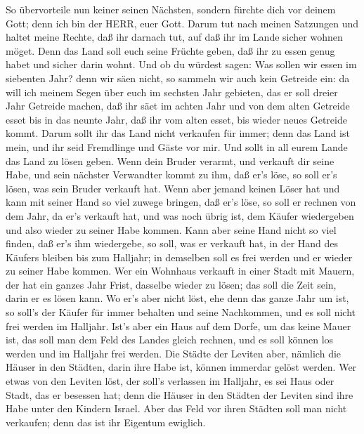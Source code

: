  So übervorteile nun keiner seinen Nächsten, sondern
fürchte dich vor deinem Gott; denn ich bin der HERR, euer Gott.
 Darum tut nach meinen Satzungen und haltet meine Rechte,
daß ihr darnach tut, auf daß ihr im Lande sicher wohnen möget.
 Denn das Land soll euch seine Früchte geben, daß ihr zu
essen genug habet und sicher darin wohnt.  Und ob du
würdest sagen: Was sollen wir essen im siebenten Jahr? denn wir säen
nicht, so sammeln wir auch kein Getreide ein:  da will ich
meinem Segen über euch im sechsten Jahr gebieten, das er soll dreier
Jahr Getreide machen,  daß ihr säet im achten Jahr und von
dem alten Getreide esset bis in das neunte Jahr, daß ihr vom alten
esset, bis wieder neues Getreide kommt.  Darum sollt ihr
das Land nicht verkaufen für immer; denn das Land ist mein, und ihr seid
Fremdlinge und Gäste vor mir.  Und sollt in all eurem Lande
das Land zu lösen geben.  Wenn dein Bruder verarmt, und
verkauft dir seine Habe, und sein nächster Verwandter kommt zu ihm, daß
er's löse, so soll er's lösen, was sein Bruder verkauft hat.
 Wenn aber jemand keinen Löser hat und kann mit seiner Hand
so viel zuwege bringen, daß er's löse,  so soll er rechnen
von dem Jahr, da er's verkauft hat, und was noch übrig ist, dem Käufer
wiedergeben und also wieder zu seiner Habe kommen.  Kann
aber seine Hand nicht so viel finden, daß er's ihm wiedergebe, so soll,
was er verkauft hat, in der Hand des Käufers bleiben bis zum Halljahr;
in demselben soll es frei werden und er wieder zu seiner Habe kommen.
 Wer ein Wohnhaus verkauft in einer Stadt mit Mauern, der
hat ein ganzes Jahr Frist, dasselbe wieder zu lösen; das soll die Zeit
sein, darin er es lösen kann.  Wo er's aber nicht löst, ehe
denn das ganze Jahr um ist, so soll's der Käufer für immer behalten und
seine Nachkommen, und es soll nicht frei werden im Halljahr.
 Ist's aber ein Haus auf dem Dorfe, um das keine Mauer ist,
das soll man dem Feld des Landes gleich rechnen, und es soll können los
werden und im Halljahr frei werden.  Die Städte der Leviten
aber, nämlich die Häuser in den Städten, darin ihre Habe ist, können
immerdar gelöst werden.  Wer etwas von den Leviten löst,
der soll's verlassen im Halljahr, es sei Haus oder Stadt, das er
besessen hat; denn die Häuser in den Städten der Leviten sind ihre Habe
unter den Kindern Israel.  Aber das Feld vor ihren Städten
soll man nicht verkaufen; denn das ist ihr Eigentum ewiglich.

